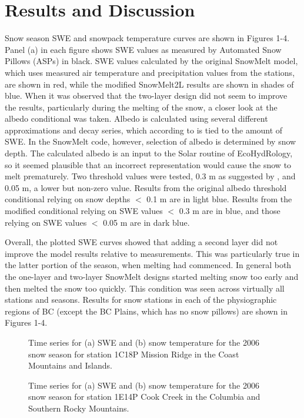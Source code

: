 \documentclass[12pt]{article}
\begin{document}
\section{Results and Discussion}
Snow season SWE and snowpack temperature curves are shown in Figures 1-4.
Panel (a) in each figure shows SWE values as measured by Automated Snow Pillows (ASPs) in black.
SWE values calculated by the original SnowMelt model, which uses measured air temperature and precipitation values from the stations, are shown in red, while the modified SnowMelt2L results are shown in shades of blue.
When it was observed that the two-layer design did not seem to improve the results, particularly during the melting of the snow, a closer look at the albedo conditional was taken.
Albedo is calculated using several different approximations \citep{kung1964study,mckay1981distribution,armycorps1960runoff} and decay series, which according to \citet{walter2005process} is tied to the amount of SWE.
In the SnowMelt code, however, selection of albedo is determined by snow depth.
The calculated albedo is an input to the Solar routine of EcoHydRology, so it seemed plausible that an incorrect representation would cause the snow to melt prematurely.
Two threshold values were tested, 0.3 m as suggested by \citet{walter2005process}, and 0.05 m, a lower but non-zero value.
Results from the original albedo threshold conditional relying on snow depths $<$ 0.1 m are in light blue.
Results from the modified conditional relying on SWE values $<$ 0.3 m are in blue, and those relying on SWE values $<$ 0.05 m are in dark blue.

Overall, the plotted SWE curves showed that adding a second layer did not improve the model results relative to measurements.
This was particularly true in the latter portion of the season, when melting had commenced.
In general both the one-layer and two-layer SnowMelt designs started melting snow too early and then melted the snow too quickly.
This condition was seen across virtually all stations and seasons.
Results for snow stations in each of the physiographic regions of BC (except the BC Plains, which has no snow pillows) are shown in Figures 1-4.

\begin{figure}
  \caption{Time series for (a) SWE and (b) snow temperature for the 2006 snow season for station 1C18P Mission Ridge in the Coast Mountains and Islands.}
  \label{fig:SM2L_2006_reg1}
  
  \bigskip
  \bigskip
  \bigskip
  \bigskip

  \caption{Time series for (a) SWE and (b) snow temperature for the 2006 snow season for station 1E14P Cook Creek in the Columbia and Southern Rocky Mountains.}
  \label{fig:SM2L_2006_reg5}
\end{figure}
\end{document}
